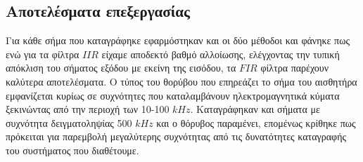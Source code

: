 \documentclass[breaklines=true, 12pt]{article}
\begin{document}
\subsection{Αποτελέσματα επεξεργασίας}
\label{sec:org88b3ee5}
Για κάθε σήμα που καταγράφηκε εφαρμόστηκαν και οι δύο μέθοδοι και φάνηκε πως
ενώ για τα φίλτρα \(IIR\) είχαμε αποδεκτό βαθμό αλλοίωσης, ελέγχοντας την
τυπική απόκλιση του σήματος εξόδου με εκείνη της εισόδου, τα \(FIR\)
φίλτρα παρέχουν καλύτερα αποτελέσματα. Ο τύπος του θορύβου που επηρεάζει το
σήμα του αισθητήρα εμφανίζεται κυρίως σε συχνότητες που καταλαμβάνουν
ηλεκτρομαγνητικά κύματα ξεκινώντας από την περιοχή των 10-100 \(kHz\).
Καταγράφηκαν και σήματα με συχνότητα δειγματοληψίας 500 \(kHz\) και ο θόρυβος
παραμένει, επομένως κρίθηκε πως πρόκειται για παρεμβολή μεγαλύτερης συχνότητας
από τις δυνατότητες καταγραφής του συστήματος που διαθέτουμε.
\end{document}
